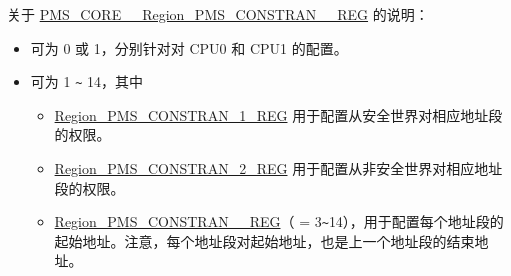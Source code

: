 \documentclass[main\_\_CN.tex]{subfiles}
\begin{document}
关于 \hyperref[regdesc:PMSCORE0REGIONPMSCONSTRAIN1REG]{PMS\_CORE\_\_Region\_PMS\_CONSTRAN\_\_REG} 的说明：
\begin{itemize}
    \item {} 可为 0 或 1，分别针对对 CPU0 和 CPU1 的配置。
    \item {} 可为 1 \verb+~+ 14，其中
    \begin{itemize}
        \item \hyperref[regdesc:PMSCORE0REGIONPMSCONSTRAIN1REG]{Region\_PMS\_CONSTRAN\_1\_REG} 用于配置从安全世界对相应地址段的权限。
        \item \hyperref[regdesc:PMSCORE0REGIONPMSCONSTRAIN2REG]{Region\_PMS\_CONSTRAN\_2\_REG} 用于配置从非安全世界对相应地址段的权限。
        \item \hyperref[regdesc:PMSCORE0REGIONPMSCONSTRAIN3REG]{Region\_PMS\_CONSTRAN\_\_REG}（ = 3\verb+~+14），用于配置每个地址段的起始地址。注意，每个地址段对起始地址，也是上一个地址段的结束地址。
    \end{itemize}
\end{itemize}
\end{document}
